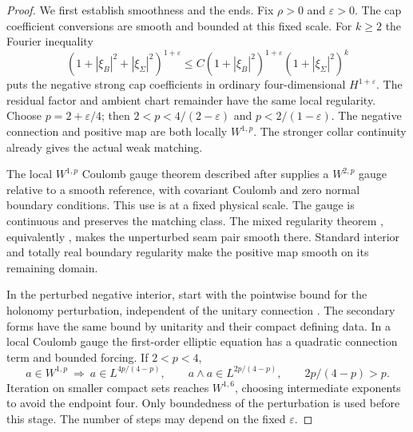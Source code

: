 \documentclass[11pt]{amsart}
\theoremstyle{definition}
\theoremstyle{remark}
\theoremstyle{plain}
\begin{document}
\begin{proof}
We first establish smoothness and the ends. Fix $\rho>0$ and
$\varepsilon>0$. The cap coefficient conversions are smooth and
bounded at this fixed scale. For $k\geq2$ the Fourier inequality
\[
 (1+|\xi_B|^2+|\xi_\Sigma|^2)^{1+\varepsilon}
 \leq C(1+|\xi_B|^2)^{1+\varepsilon}(1+|\xi_\Sigma|^2)^k
\]
puts the negative strong cap coefficients in ordinary four-dimensional
$H^{1+\varepsilon}$. The residual factor and ambient chart
remainder have the same local regularity. Choose $p=2+\varepsilon/4$;
then $2<p<4/(2-\varepsilon)$ and $p<2/(1-\varepsilon)$.
The negative connection and positive map are both locally $W^{1,p}$.
The stronger collar continuity already gives the actual weak matching.

The local $W^{1,p}$ Coulomb gauge theorem described after
\cite[Theorem~1]{DaeFukLip21b} supplies a $W^{2,p}$ gauge
relative to a smooth reference, with covariant Coulomb and zero
normal boundary conditions. This use is at a fixed physical scale.
The gauge is continuous and preserves the matching class.
The mixed regularity theorem
\cite[Theorem~1]{DaeFukLip21b}, equivalently
\cite[Theorem~5.4]{DaeFukLip21a}, makes the unperturbed seam
pair smooth there. Standard interior and totally real boundary
regularity make the positive map smooth on its remaining domain.

In the perturbed negative interior, start with the pointwise bound
for the holonomy perturbation, independent of the unitary connection
\cite[Proposition~6.1(ii)]{DaeFukLip21a}. The secondary forms
have the same bound by unitarity and their compact defining data.
In a local Coulomb gauge the first-order elliptic equation has a
quadratic connection term and bounded forcing. If $2<p<4$,
\[
 a\in W^{1,p}\ \Longrightarrow\ a\in L^{4p/(4-p)},\qquad
                  a\wedge a\in L^{2p/(4-p)},\qquad 2p/(4-p)>p.
\]
Iteration on smaller compact sets reaches $W^{1,6}$, choosing
intermediate exponents to avoid the endpoint four. Only boundedness
of the perturbation is used before this stage. The number of steps
may depend on the fixed $\varepsilon$.


\end{proof}
\end{document}
